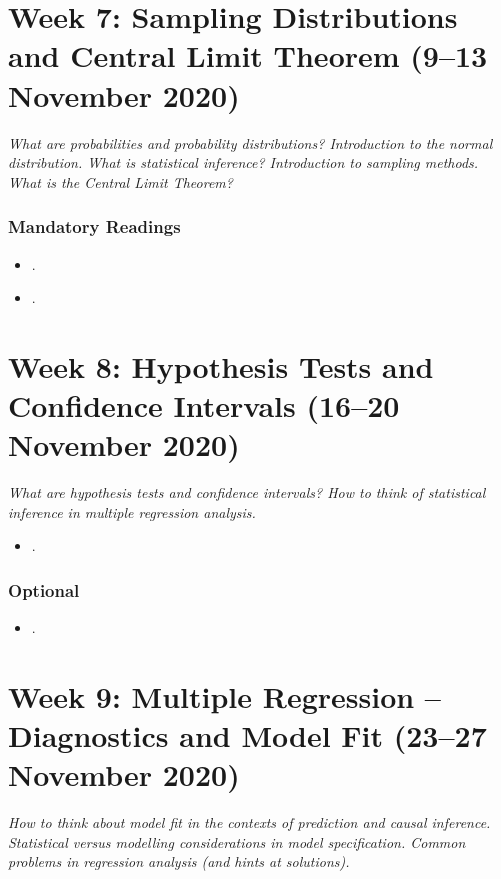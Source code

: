 \documentclass[abstract=on,parskip=full,headings=standardclasses,fontsize=11pt,paper=a4]{scrartcl}
\begin{document}
\section{Week 7:  Sampling Distributions and Central Limit Theorem (9--13 November 2020)}


\textit{What are probabilities and probability distributions? Introduction to the normal distribution. What is statistical inference? Introduction to sampling methods. What is the Central Limit Theorem?}


\subsubsection*{Mandatory Readings}
\begin{itemize}
\item {}.
\item {}.
\end{itemize}


\section{Week 8:  Hypothesis Tests and Confidence Intervals (16--20 November 2020)}


\textit{What are hypothesis tests and confidence intervals? How to think of statistical inference in multiple regression analysis.}


\begin{itemize}
\item {}.
\end{itemize}


\subsubsection*{Optional}
\begin{itemize}
\item {}.
\end{itemize}


\section{Week 9: Multiple Regression --  Diagnostics and Model Fit (23--27 November 2020)}


\textit{How to think about model fit in the contexts of prediction and causal inference. Statistical versus modelling considerations in model specification. Common problems in regression analysis (and hints at solutions).}
\end{document}
